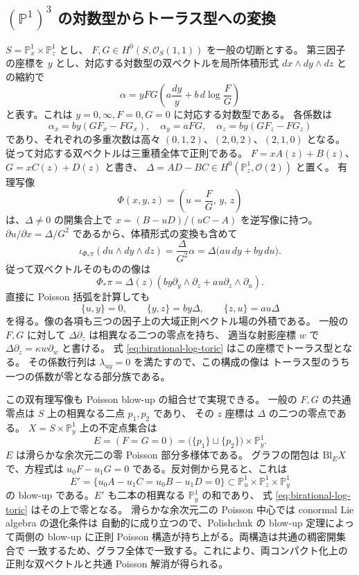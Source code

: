 \subsection{\texorpdfstring{$(\mathbb P^1)^3$}{P1 x P1 x P1} の対数型からトーラス型への変換}
$S=\mathbb P^1_x\times\mathbb P^1_z$ とし、
$F,G\in H^0(S,\mathcal O_S(1,1))$ を一般の切断とする。
第三因子の座標を $y$ とし、対応する対数型の双ベクトルを局所体積形式
$dx\wedge dy\wedge dz$ との縮約で
\[
 \alpha=yFG\left(a\frac{dy}{y}+b\,d\log\frac FG\right)
\]
と表す。これは $y=0,\infty,F=0,G=0$ に対応する対数型である。
各係数は
\[
 \alpha_x=by(GF_x-FG_x),\quad
 \alpha_y=aFG,\quad
 \alpha_z=by(GF_z-FG_z)
\]
であり、それぞれの多重次数は高々 $(0,1,2)$、$(2,0,2)$、$(2,1,0)$
となる。従って対応する双ベクトルは三重積全体で正則である。
$F=xA(z)+B(z)$、$G=xC(z)+D(z)$ と書き、
$\Delta=AD-BC\in H^0(\mathbb P^1_z,\mathcal O(2))$ と置く。
有理写像
\[
 \Phi(x,y,z)=\left(u=\frac FG,\,y,\,z\right)
\]
は、$\Delta\ne0$ の開集合上で
$x=(B-uD)/(uC-A)$ を逆写像に持つ。
$\partial u/\partial x=\Delta/G^2$ であるから、体積形式の変換も含めて
\[
 \iota_{\Phi_*\pi}(du\wedge dy\wedge dz)
   =\frac{\Delta}{G^2}\alpha
   =\Delta\bigl(a u\,dy+b y\,du\bigr).
\]
従って双ベクトルそのものの像は
\[
 \Phi_*\pi
   =\Delta(z)\left(b y\partial_y\wedge\partial_z
                         +a u\partial_z\wedge\partial_u\right).
 \tag{T}\label{eq:birational-log-toric}
\]
直接に Poisson 括弧を計算しても
\[
 \{u,y\}=0,\qquad \{y,z\}=by\Delta,\qquad
 \{z,u\}=au\Delta
\]
を得る。像の各項も三つの因子上の大域正則ベクトル場の外積である。
一般の $F,G$ に対して $\Delta\partial_z$ は相異なる二つの零点を持ち、
適当な射影座標 $w$ で $\Delta\partial_z=\kappa w\partial_w$ と書ける。
式 \eqref{eq:birational-log-toric} はこの座標でトーラス型となる。
その係数行列は $\lambda_{uy}=0$ を満たすので、この構成の像は
トーラス型のうち一つの係数が零となる部分族である。

この双有理写像も Poisson blow-up の組合せで実現できる。
一般の $F,G$ の共通零点は $S$ 上の相異なる二点 $p_1,p_2$ であり、
その $z$ 座標は $\Delta$ の二つの零点である。
$X=S\times\mathbb P^1_y$ 上の不定点集合は
\[
 E=(F=G=0)=\bigl(\{p_1\}\sqcup\{p_2\}\bigr)\times\mathbb P^1_y.
\]
$E$ は滑らかな余次元二の零 Poisson 部分多様体である。
グラフの閉包は $\mathrm{Bl}_E X$ で、方程式は
$u_0F-u_1G=0$ である。反対側から見ると、これは
\[
 E'=\{u_0A-u_1C=u_0B-u_1D=0\}
       \subset\mathbb P^1_u\times\mathbb P^1_z\times\mathbb P^1_y
\]
の blow-up である。$E'$ も二本の相異なる $\mathbb P^1_y$ の和であり、
式 \eqref{eq:birational-log-toric} はその上で零となる。
滑らかな余次元二の Poisson 中心では conormal Lie algebra の退化条件は
自動的に成り立つので、Polishchuk の blow-up 定理によって両側の
blow-up に正則 Poisson 構造が持ち上がる。両構造は共通の稠密開集合で
一致するため、グラフ全体で一致する。これにより、両コンパクト化上の正則な双ベクトルと共通 Poisson 解消が得られる。
